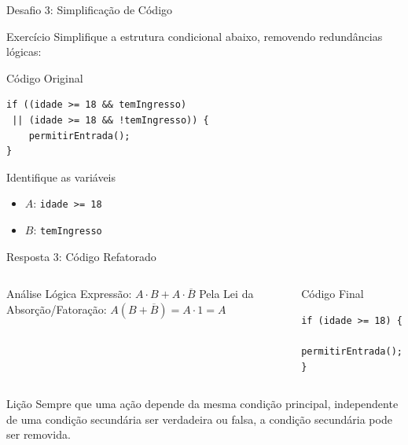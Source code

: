 \documentclass[9pt]{beamer}
\begin{document}
\begin{frame}[fragile]{Desafio 3: Simplificação de Código}

\begin{block}{Exercício}
Simplifique a estrutura condicional abaixo, removendo redundâncias lógicas:
\end{block}

\begin{alertblock}{Código Original}
\begin{verbatim}
if ((idade >= 18 && temIngresso) 
 || (idade >= 18 && !temIngresso)) {
    permitirEntrada();
}
\end{verbatim}
\end{alertblock}

\begin{block}{Identifique as variáveis}
\begin{itemize}
    \item $A$: \texttt{idade >= 18}
    \item $B$: \texttt{temIngresso}
\end{itemize}
\end{block}

\end{frame}

\begin{frame}[fragile]{Resposta 3: Código Refatorado}

\begin{columns}

\begin{block}{Análise Lógica}
Expressão: $A \cdot B + A \cdot \overline{B}$
\vspace{0.2cm}
Pela Lei da Absorção/Fatoração:
$A(B + \overline{B}) = A \cdot 1 = A$
\end{block}

\begin{block}{Código Final}
\begin{verbatim}
if (idade >= 18) {
    permitirEntrada();
}
\end{verbatim}
\end{block}

\end{columns}

\vspace{0.4cm}
\begin{alertblock}{Lição}
Sempre que uma ação depende da mesma condição principal, independente de uma condição secundária ser verdadeira ou falsa, a condição secundária pode ser removida.
\end{alertblock}

\end{frame}
\end{document}
